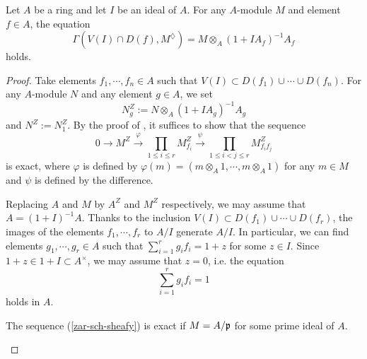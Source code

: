 \begin{thm}\label{t-FK-sheafy}
Let $A$ be a ring and let $I$ be an ideal of $A$. 
For any $A$-module $M$ and element $f \in A$, 
the equation 
$$\Gamma(V(I) \cap D(f), M^{\diamondsuit})=M \otimes_A (1+IA_f)^{-1}A_f$$
holds. 
\end{thm}

\begin{proof}
Take elements $f_1, \cdots, f_n \in A$ such that 
$V(I) \subset D(f_1) \cup \cdots \cup D(f_n)$. 
For any $A$-module $N$ and any element $g \in A$, we set 
$$N_g^Z:=N \otimes_A (1+IA_g)^{-1}A_g$$
and $N^Z:=N_1^Z$. 
By the proof of \cite[Ch. I, Proposition B.1.4]{FK}, 
it suffices to show that the sequence 
\begin{equation}\label{zar-sch-sheafy}
0 \to M^Z \xrightarrow{\varphi} 
\prod_{1 \leq i\leq r} M_{f_i}^{Z} \xrightarrow{\psi} 
\prod_{1 \leq i<j \leq r} M_{f_if_j}^{Z}
\end{equation}
is exact, where $\varphi$ is defined by $\varphi(m)=(m \otimes_A 1, \cdots, m \otimes_A 1)$ for any $m \in M$ and 
$\psi$ is defined by the difference. 




Replacing $A$ and $M$ by $A^Z$ and $M^Z$ respectively, 
we may assume that $A=(1+I)^{-1}A$. 
Thanks to the inclusion $V(I) \subset D(f_1) \cup \cdots \cup D(f_r)$, 
the images of the elements $f_1, \cdots, f_r$ to $A/I$ 
generate $A/I$. 
In particular, we can find elements $g_1, \cdots, g_r \in A$ such that 
$\sum_{i=1}^rg_if_i=1+z$ for some $z \in I$. 
Since $1+z \in 1+I \subset A^{\times}$, 
we may assume that $z=0$, i.e. the equation 
\begin{equation}\label{e-FK-sheafy1}
\sum_{i=1}^rg_if_i=1
\end{equation}
holds in $A$.  

\setcounter{step}{0}
\begin{step}\label{s-domain}
The sequence (\ref{zar-sch-sheafy}) is exact if $M=A/\mathfrak{p}$ for some prime ideal of $A$. 
\end{step}


\end{proof}
